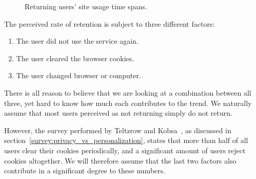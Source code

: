 \begin{figure}[t]
  \caption{Returning users' site usage time spans.}
  \label{fig:user_timediffs}
\end{figure}

The perceived rate of retention is subject to three different factors:

\begin{enumerate}
  \item The user did not use the service again.
  \item The user cleared the browser cookies.
  \item The user changed browser or computer.
\end{enumerate}

There is all reason to believe that we are looking at a combination between all three, yet hard to know how much each contributes to the trend. We naturally assume that most users perceived as not returning simply do not return.

However, the survey performed by Teltzrow and Kobsa~\cite{Teltzrow2004}, as discussed in section~\ref{survey:privacy_vs_personalization}, states that more than half of all users clear their cookies periodically, and a significant amount of users reject cookies altogether. We will therefore assume that the last two factors also contribute in a significant degree to these numbers.

